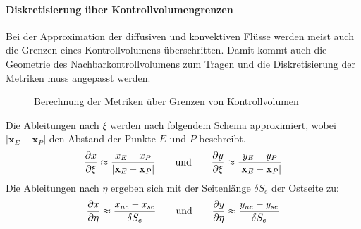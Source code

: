 \paragraph{Diskretisierung über Kontrollvolumengrenzen}

Bei der Approximation der diffusiven und konvektiven Flüsse werden meist
auch die Grenzen eines Kontrollvolumens überschritten. Damit kommt auch
die Geometrie des Nachbarkontrollvolumens zum Tragen und die Diskretisierung der
Metriken muss angepasst werden.
\begin{figure}[ht]
  
\centering
\caption{Berechnung der Metriken über Grenzen von Kontrollvolumen}
\end{figure}

Die Ableitungen nach $\xi$ werden nach folgendem Schema approximiert, wobei
$\vert \mathbf{x}_E -\mathbf{x}_P \vert$ den Abstand der Punkte $E$ und $P$ beschreibt.
\begin{equation}
  \pder[x]{\xi} \approx \frac{x_E-x_P}{\vert \mathbf{x}_E -\mathbf{x}_P \vert} \qquad
  \text{und} \qquad \pder[y]{\xi} \approx \frac{y_E-y_P}{\vert \mathbf{x}_E -\mathbf{x}_P \vert}
\end{equation}
Die Ableitungen nach $\eta$ ergeben sich mit der Seitenlänge $\delta S_e$ der Ostseite
zu:
\begin{equation}
  \pder[x]{\eta} \approx \frac{x_{ne}-x_{se}}{\delta S_e} \qquad
  \text{und} \qquad \pder[y]{\eta} \approx \frac{y_{ne}-y_{se}}{\delta S_e}
\end{equation}
